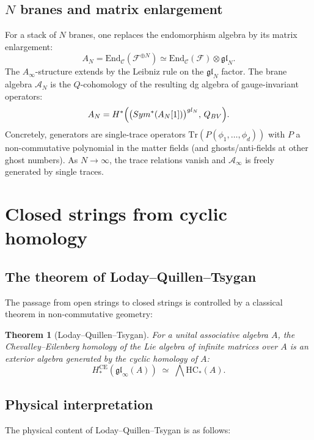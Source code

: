 \documentclass[11pt]{article}
\newtheorem{theorem}{Theorem}[section]
\theoremstyle{definition}
\theoremstyle{remark}
\newcommand{\End}{\mathrm{End}}
\newcommand{\Sym}{\mathrm{Sym}}
\newcommand{\Tr}{\mathrm{Tr}}
\newcommand{\HC}{\mathrm{HC}}
\newcommand{\CE}{\mathrm{CE}}
\newcommand{\Ainf}{A_\infty}
\newcommand{\cA}{\mathcal{A}}
\newcommand{\cC}{\mathcal{C}}
\newcommand{\cF}{\mathcal{F}}
\newcommand{\frakgl}{\mathfrak{gl}}
\begin{document}
\subsection{$N$ branes and matrix enlargement}

For a stack of $N$ branes, one replaces the endomorphism algebra by its matrix
enlargement:
\[
 A_N = \End_\cC(\cF^{\oplus N}) \simeq \End_\cC(\cF) \otimes \frakgl_N.
\]
The $\Ainf$-structure extends by the Leibniz rule on the $\frakgl_N$ factor.
The brane algebra $\cA_N$ is the $Q$-cohomology of the resulting dg algebra
of gauge-invariant operators:
\[
 \cA_N = H^*\Bigl(
 \bigl(\Sym^*(A_N[1])\bigr)^{\frakgl_N}, \, Q_{\mathrm{BV}}
 \Bigr).
\]
Concretely, generators are single-trace operators $\Tr(P(\phi_1, \ldots,
\phi_d))$ with $P$ a non-commutative polynomial in the matter fields (and
ghosts/anti-fields at other ghost numbers). As $N \to \infty$, the trace
relations vanish and $\cA_\infty$ is freely generated by single traces.


\section{Closed strings from cyclic homology}
\label{sec:closed-strings}

\subsection{The theorem of Loday--Quillen--Tsygan}

The passage from open strings to closed strings is controlled by a classical
theorem in non-commutative geometry:

\begin{theorem}[Loday--Quillen--Tsygan]
\label{thm:lqt}
For a unital associative algebra $A$, the Chevalley--Eilenberg homology of the
Lie algebra of infinite matrices over $A$ is an exterior algebra generated by
the cyclic homology of $A$:
\[
 H_*^{\CE}(\frakgl_\infty(A)) \;\simeq\; \bigwedge \HC_*(A).
\]
\end{theorem}

\subsection{Physical interpretation}
\label{sec:lqt-physics}

The physical content of Loday--Quillen--Tsygan is as follows:
\end{document}
